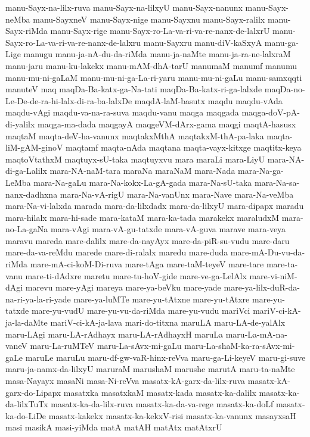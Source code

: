 {manu-Sayx-na-lilx-ruva
manu-Sayx-na-lilxyU
manu-Sayx-nanunx
manu-Sayx-neMba
manu-SayxneV
manu-Sayx-nige
manu-Sayxnu
manu-Sayx-ralilx
manu-Sayx-riMda
manu-Sayx-rige
manu-Sayx-ro-La-va-ri-va-re-nanx-de-lalxrU
manu-Sayx-ro-La-va-ri-va-re-nanx-de-lalxru
manu-Sayxru
manu-diV-kaSxyA
manu-ga-Lige
manugu
manu-ja-nA-du-da-riMda
manu-ja-naMte
manu-ja-ra-ne-lalxraM
manu-jaru
manu-ku-lakekx
manu-mAM-dhA-tarU
manumaM
manumf
manumu
manu-mu-ni-gaLaM
manu-mu-ni-ga-La-ri-yaru
manu-mu-ni-gaLu
manu-samxqqti
manuteV
maq
maqDa-Ba-katx-ga-Na-tati
maqDa-Ba-katx-ri-ga-lalxde
maqDa-no-Le-De-de-ra-hi-lalx-di-ra-ba-lalxDe
maqdA-laM-basutx
maqdu
maqdu-vAda
maqdu-vAgi
maqdu-va-na-ra-suva
maqdu-vanu
maqga
maqgada
maqga-doV-pA-di-yalilx
maqga-ma-dada
maqgayA
maqgeVM-dArx-gama
maqgi
maqtA-hasusx
maqtaM
maqta-deV-ha-vanunx
maqtakxMthA
maqtakxM-thA-pa-laka
maqta-liM-gAM-ginoV
maqtamf
maqta-nAda
maqtana
maqta-vayx-kitxge
maqtitx-keya
maqtoVtathxM
maqtuyx-sU-taka
maqtuyxvu
mara
maraLi
mara-LiyU
mara-NA-di-ga-Lalilx
mara-NA-naM-tara
maraNa
maraNaM
mara-Nada
mara-Na-ga-LeMba
mara-Na-gaLu
mara-Na-kokx-La-gA-gada
mara-Na-sU-taka
mara-Na-sa-nanx-dadhxna
mara-Na-vA-rigU
mara-Na-vanUnx
mara-Nave
mara-Na-veMba
mara-Na-vi-lalxda
marada
mara-da-lilxdadx
mara-da-lilxyU
mara-dipapx
maradu
mara-hilalx
mara-hi-sade
mara-kataM
mara-ka-tada
marakekx
maraludxM
mara-no-La-gaNa
mara-vAgi
mara-vA-gu-tatxde
mara-vA-guva
marave
mara-veya
maravu
mareda
mare-dalilx
mare-da-nayAyx
mare-da-piR-su-vudu
mare-daru
mare-da-va-reMdu
marede
mare-di-ralalx
maredu
mare-duda
mare-mA-Du-vu-da-riMda
mare-mA-ci-koM-Di-ruva
mare-tAga
mare-taM-teyeV
mare-tare
mare-ta-vanu
mare-ti-dAdxre
maretu
mare-tu-hoV-gide
mare-ve-ga-LelAlx
mare-vi-niM-dAgi
marevu
mare-yAgi
mareya
mare-ya-beVku
mare-yade
mare-ya-lilx-duR-da-na-ri-ya-la-ri-yade
mare-ya-luMTe
mare-yu-tAtxne
mare-yu-tAtxre
mare-yu-tatxde
mare-yu-vudU
mare-yu-vu-da-riMda
mare-yu-vudu
mariVci
mariV-ci-kA-ja-la-daMte
mariV-ci-kA-ja-lava
mari-do-titxna
maruLA
maru-LA-de-yalAlx
maru-LAgi
maru-LA-rAdhayx
maru-LA-rAdhayxH
maruLa
maru-La-mA-na-vaneV
maru-La-ruMTeV
maru-La-sAvx-mi-gaLu
maru-La-shaM-ka-ra-sAvx-mi-gaLe
maruLe
maruLu
maru-df-gw-vaR-hinx-reVva
maru-ga-Li-keyeV
maru-gi-suve
maru-ja-namx-da-lilxyU
maruraM
marushaM
marushe
marutA
maru-ta-naMte
masa-Nayayx
masaNi
masa-Ni-reVva
masatx-kA-garx-da-lilx-ruva
masatx-kA-garx-do-Lipapx
masatxka
masatxkaM
masatx-kada
masatx-ka-dalilx
masatx-ka-da-lilxTuTx
masatx-ka-da-lilx-ruva
masatx-ka-da-va-rege
masatx-ka-doLf
masatx-ka-do-LiDe
masatx-kakekx
masatx-ka-kekxV-risi
masatx-ka-vanunx
masayxsaH
masi
masikA
masi-yiMda
matA
matAH
matAtx
matAtxrU
}
